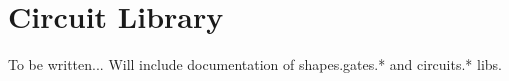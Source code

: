 %
%
%



\section{Circuit Library}
\label{section-library-circuits}

To be written... Will include documentation of shapes.gates.* and
circuits.* libs.


\endinput



